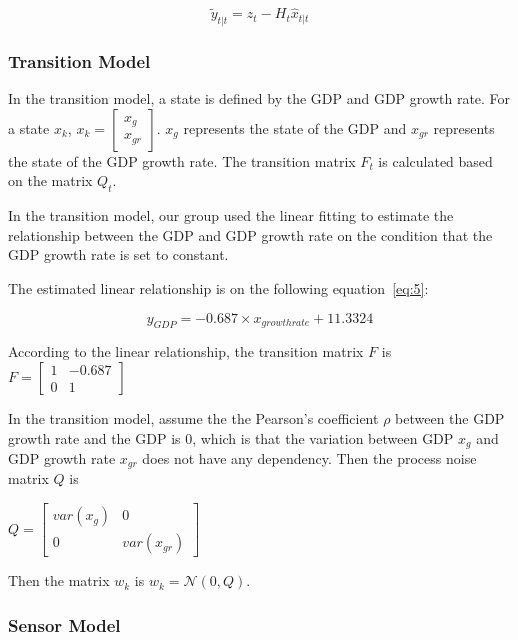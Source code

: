 \documentclass[11pt, a4paper]{article}
\begin{document}
\begin{equation}
\widetilde{y}_{t|t} = z_t - H_t\widehat{x}_{t|t}
\end{equation}

\subsubsection{Transition Model}

In the transition model, a state is defined by the GDP and GDP growth rate. For a state $x_k$, $x_k = \begin{bmatrix} x_g \\ x_{gr}  \end{bmatrix}$. $x_g$ represents the state of the GDP and $x_{gr}$ represents the state of the GDP growth rate. The transition matrix $F_t$ is calculated based on the matrix $Q_t$.

In the transition model, our group used the linear fitting to estimate the relationship between the GDP and GDP growth rate on the condition that the GDP growth rate is set to constant. 

The estimated linear relationship is on the following equation~\ref{eq:5}:

\begin{equation}
y_{GDP} = -0.687\times x_{growth rate} + 11.3324
\label{eq:5}
\end{equation}

According to the linear relationship, the transition matrix $F$ is $F = \begin{bmatrix} 1 & -0.687 \\ 0 & 1  \end{bmatrix}$

In the transition model, assume the the Pearson's coefficient $\rho$ between the GDP growth rate and the GDP is 0, which is that the variation between GDP $x_g$ and GDP growth rate $x_{gr}$ does not have any dependency. Then the process noise matrix $Q$ is 
\begin{center}
$Q = \begin{bmatrix} var(x_g) & 0 \\ 0 & var(x_{gr})  \end{bmatrix}$ 
\end{center}

Then the matrix $w_k$ is $w_k = \mathcal{N}(0,Q)$.


\subsubsection{Sensor Model}
\end{document}

